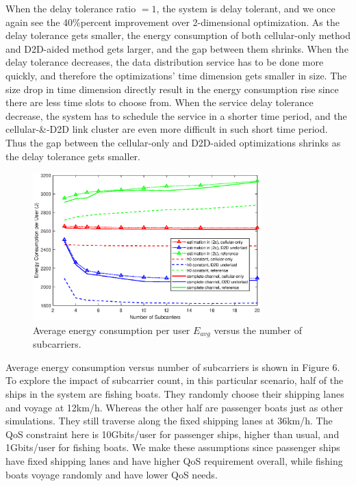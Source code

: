\documentclass{ieeeaccess}
\begin{document}
When the delay tolerance ratio $= 1$, the system is delay tolerant, and we once again see the 40\%percent improvement over 2-dimensional optimization. As the delay tolerance gets smaller, the energy consumption of both cellular-only method and D2D-aided method gets larger, and the gap between them shrinks. When the delay tolerance decreases, the data distribution service has to be done more quickly, and therefore the optimizations' time dimension gets smaller in size. The size drop in time dimension directly result in the energy consumption rise since there are less time slots to choose from. When the service delay tolerance decrease, the system has to schedule the service in a shorter time period, and the cellular-\&-D2D link cluster are even more difficult in such short time period. Thus the gap between the cellular-only and D2D-aided optimizations shrinks as the delay tolerance gets smaller.




\begin{figure} [htb]
\includegraphics*[width=8.8cm]{Ns.eps}
\caption{Average energy consumption per user $E_{avg}$ versus the number of subcarriers.} \label{fig:6}
\end{figure}




Average energy consumption versus number of subcarriers is shown in Figure 6. To explore the impact of subcarrier count, in this particular scenario, half of the ships in the system are fishing boats. They randomly choose their shipping lanes and voyage at 12km/h. Whereas the other half are passenger boats just as other simulations. They still traverse along the fixed shipping lanes at 36km/h. The QoS constraint here is 10Gbits/user for passenger ships, higher than usual, and 1Gbits/user for fishing boats. We make these assumptions since passenger ships have fixed shipping lanes and have higher QoS requirement overall, while fishing boats voyage randomly and have lower QoS needs.
\end{document}
